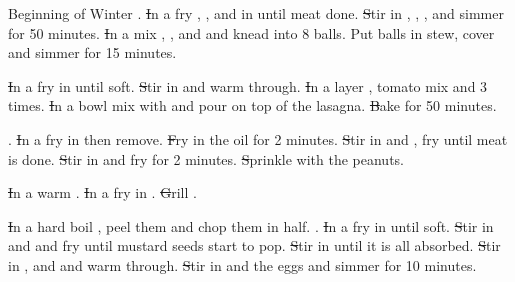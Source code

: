 \documentclass{cookbook}
\begin{document}
\begin{menu}{Beginning of Winter}
%
{%
	\st	\spud.
	\st	In a \wok fry
		,
		,
		and
		in
		until meat done.
	\st	Stir in
		,
		,
		,
		and
		simmer for 50 minutes.
	\st	In a \bowl mix
		,
		,
		and
		and knead into 8 balls.
		Put balls in stew, cover and
		simmer for 15 minutes.
}%

%
{%
	\st	In a \wok fry
		in
		until soft.
	\st	Stir in
		and warm through.
	\st	In a \cass layer
		,
		tomato mix and
		 3 times.
	\st	In a bowl mix
		with
		 and pour on top of the lasagna.
	\st	Bake \med for 50 minutes.
}%

%
{%
	\st	\noodles.
	\st	In a \wok fry
		in 
		 then remove.
	\st	Fry 
		in the oil for 2 minutes.
	\st	Stir in
		and
		,
		fry until meat is done.
	\st	Stir in 
		and fry for 2 minutes.
	\st	Sprinkle with the peanuts.
}%

%
{%
	\st	In a \pan warm
		.
	\st	In a \wok fry
		in
		.
	\st	Grill
		.
}%

%
{%
	\st	In a \pan hard boil
		,
		peel them and chop them in half.
	\st	\rice.
	\st	In a \wok fry
		in 
		until soft.
	\st	Stir in
		and
		and fry until mustard seeds start to pop.
	\st	Stir in
		 until it is all absorbed.
	\st	Stir in
		,
		and
		and warm through.
	\st	Stir in
		and
		the eggs
		and simmer for 10 minutes.
}%


\end{menu}
\end{document}
